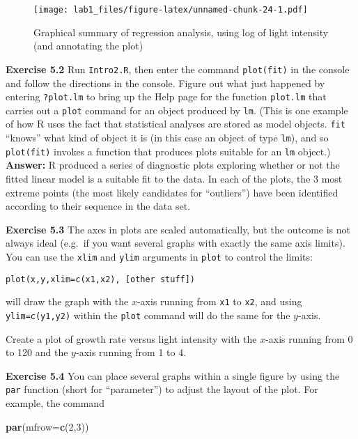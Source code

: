 \documentclass[11pt,]{article}
\newenvironment{Shaded}{\begin{snugshade}}{\end{snugshade}}
\newcommand{\KeywordTok}[1]{\textcolor[rgb]{0.13,0.29,0.53}{\textbf{#1}}}
\newcommand{\DataTypeTok}[1]{\textcolor[rgb]{0.13,0.29,0.53}{#1}}
\newcommand{\DecValTok}[1]{\textcolor[rgb]{0.00,0.00,0.81}{#1}}
\newcommand{\NormalTok}[1]{#1}
\begin{document}
\begin{figure}
\centering
\texttt{[image: lab1\_files/figure-latex/unnamed-chunk-24-1.pdf]}
\caption{Graphical summary of regression analysis, using log of light
intensity (and annotating the plot)}
\end{figure}

\textbf{Exercise 5.2} Run \texttt{Intro2.R}, then enter the command
\texttt{plot(fit)} in the console and follow the directions in the
console. Figure out what just happened by entering \texttt{?plot.lm} to
bring up the Help page for the function \texttt{plot.lm} that carries
out a \texttt{plot} command for an object produced by \texttt{lm}. (This
is one example of how R uses the fact that statistical analyses are
stored as model objects. \texttt{fit} ``knows'' what kind of object it
is (in this case an object of type \texttt{lm}), and so
\texttt{plot(fit)} invokes a function that produces plots suitable for
an \texttt{lm} object.) \textbf{Answer:} R produced a series of
diagnostic plots exploring whether or not the fitted linear model is a
suitable fit to the data. In each of the plots, the 3 most extreme
points (the most likely candidates for ``outliers'') have been
identified according to their sequence in the data set.

\textbf{Exercise 5.3} The axes in plots are scaled automatically, but
the outcome is not always ideal (e.g.~if you want several graphs with
exactly the same axis limits). You can use the \texttt{xlim} and
\texttt{ylim} arguments in \texttt{plot} to control the limits:

\begin{verbatim}
plot(x,y,xlim=c(x1,x2), [other stuff]) 
\end{verbatim}

will draw the graph with the \(x\)-axis running from \texttt{x1} to
\texttt{x2}, and using \texttt{ylim=c(y1,y2)} within the \texttt{plot}
command will do the same for the \(y\)-axis.

Create a plot of growth rate versus light intensity with the \(x\)-axis
running from 0 to 120 and the \(y\)-axis running from 1 to 4.

\textbf{Exercise 5.4} You can place several graphs within a single
figure by using the \texttt{par} function (short for ``parameter'') to
adjust the layout of the plot. For example, the command

\begin{Shaded}
\begin{Highlighting}[]
\KeywordTok{par}\NormalTok{(}\DataTypeTok{mfrow=}\KeywordTok{c}\NormalTok{(}\DecValTok{2}\NormalTok{,}\DecValTok{3}\NormalTok{))}
\end{Highlighting}
\end{Shaded}
\end{document}
